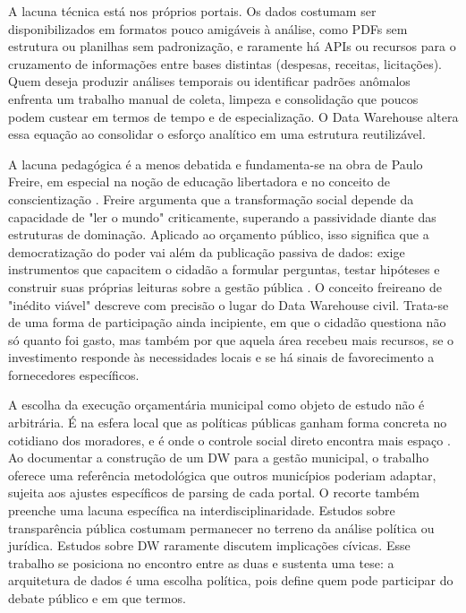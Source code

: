 A lacuna técnica está nos próprios portais. Os dados costumam ser disponibilizados em formatos pouco amigáveis à análise, como PDFs sem estrutura ou planilhas sem padronização, e raramente há APIs ou recursos para o cruzamento de informações entre bases distintas (despesas, receitas, licitações). Quem deseja produzir análises temporais ou identificar padrões anômalos enfrenta um trabalho manual de coleta, limpeza e consolidação que poucos podem custear em termos de tempo e de especialização. O Data Warehouse altera essa equação ao consolidar o esforço analítico em uma estrutura reutilizável.

A lacuna pedagógica é a menos debatida e fundamenta-se na obra de Paulo Freire, em especial na noção de educação libertadora e no conceito de conscientização \cite{freire1967liberdade}. Freire argumenta que a transformação social depende da capacidade de "ler o mundo" criticamente, superando a passividade diante das estruturas de dominação. Aplicado ao orçamento público, isso significa que a democratização do poder vai além da publicação passiva de dados: exige instrumentos que capacitem o cidadão a formular perguntas, testar hipóteses e construir suas próprias leituras sobre a gestão pública \cite{freire1996autonomia}. O conceito freireano de "inédito viável" descreve com precisão o lugar do Data Warehouse civil. Trata-se de uma forma de participação ainda incipiente, em que o cidadão questiona não só quanto foi gasto, mas também por que aquela área recebeu mais recursos, se o investimento responde às necessidades locais e se há sinais de favorecimento a fornecedores específicos.

A escolha da execução orçamentária municipal como objeto de estudo não é arbitrária. É na esfera local que as políticas públicas ganham forma concreta no cotidiano dos moradores, e é onde o controle social direto encontra mais espaço \cite{novaes2014orcamento}. Ao documentar a construção de um DW para a gestão municipal, o trabalho oferece uma referência metodológica que outros municípios poderiam adaptar, sujeita aos ajustes específicos de parsing de cada portal. O recorte também preenche uma lacuna específica na interdisciplinaridade. Estudos sobre transparência pública costumam permanecer no terreno da análise política ou jurídica. Estudos sobre DW raramente discutem implicações cívicas. Esse trabalho se posiciona no encontro entre as duas e sustenta uma tese: a arquitetura de dados é uma escolha política, pois define quem pode participar do debate público e em que termos.

